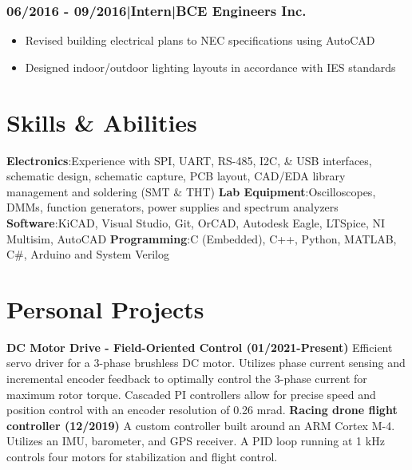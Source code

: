 \documentclass[]{article}
\begin{document}
\begin{singlespace}
\subsubsection*{06/2016 - 09/2016\hspace{3 mm}|\hspace{3 mm}Intern\hspace{3 mm}|\hspace{3 mm}BCE Engineers Inc.}
\vspace{-2mm}
\begin{itemize}
    \setlength\itemsep{0em}
    \item Revised building electrical plans to NEC specifications using AutoCAD
    \item Designed indoor/outdoor lighting layouts in accordance with IES standards 
\end{itemize}


\section*{Skills \& Abilities}

\textbf{Electronics}:\newline Experience with SPI, UART, RS-485, I2C, \& USB interfaces, schematic design, schematic capture, PCB layout,
CAD/EDA library management and soldering (SMT \& THT)
\newline\textbf{Lab Equipment}:\newline Oscilloscopes, DMMs, function generators, power supplies and spectrum analyzers
\newline\textbf{Software}:\newline KiCAD, Visual Studio, Git, OrCAD, Autodesk Eagle, LTSpice, NI Multisim, AutoCAD
\newline\textbf{Programming}:\newline C (Embedded), C++, Python, MATLAB, C\#, Arduino and System Verilog


\section*{Personal Projects}


\textbf{DC Motor Drive - Field-Oriented Control (01/2021-Present)}\newline
Efficient servo driver for a 3-phase brushless DC motor.
Utilizes phase current sensing and incremental encoder feedback to optimally control the 3-phase current for maximum rotor torque.
Cascaded PI controllers allow for precise speed and position control with an encoder resolution of 0.26 mrad.
\vspace{-2mm}\newline\newline
\textbf{Racing drone flight controller (12/2019)}\newline
A custom controller built around an ARM Cortex M-4. Utilizes an IMU, barometer, and GPS receiver. A PID loop
running at 1 kHz controls four motors for stabilization and flight control.



\end{singlespace}
\end{document}
